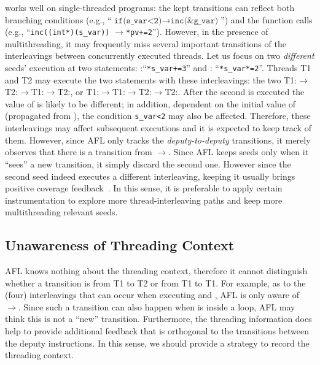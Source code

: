 \AFLIns works well on single-threaded programs: the kept transitions can reflect both branching conditions (e.g., ``$\texttt{{if}(s\_var<2)}\rightarrow\texttt{inc(\&g\_var)}$'') and the function calls (e.g., ``\texttt{inc((int*)(s\_var))} $\rightarrow $\texttt{*pv+=2}'').
However, in the presence of multithreading, 
it may frequently miss several important transitions of the interleavings between concurrently executed threads. Let us focus on two \emph{different} seeds' execution at two statements: :``\texttt{*s\_var+=3}'' and : ``\texttt{*s\_var*=2}''.  Threads T1 and T2 may execute the two statements with these interleavings: the two T1:$\rightarrow$T2:$\rightarrow$T1:$\rightarrow$T2:, or T1:$\rightarrow$T1:$\rightarrow$T2:$\rightarrow$T2:. After the second  is executed the value of  is likely to be different; in addition, dependent on the initial value of  (propagated from ), the condition \texttt{s\_var<2} may also be affected. Therefore, these interleavings may affect subsequent executions and it is expected to keep track of them. However, since AFL only tracks the \emph{deputy-to-deputy} transitions, 
it merely observes that there is a transition from $\rightarrow$.
Since AFL keeps seeds only when it ``sees'' a new transition, it simply discard the second one.
However since the second seed indeed executes a different interleaving, keeping it usually brings positive coverage feedback~\cite{fuzz_survey,ccs18_eval_fuzzing}.
In this sense, it is preferable to apply certain instrumentation to explore more thread-interleaving paths and keep more multithreading relevant seeds.

\subsection{Unawareness of Threading Context}
AFL knows nothing about the threading context, therefore it cannot distinguish whether a transition is from T1 to T2 or from T1 to T1. For example, as to the (four) interleavings that can occur when executing  and , AFL is only aware of $\rightarrow$. Since such a transition can also happen when  is inside a loop, AFL may think this is not a ``new'' transition. Furthermore, the threading information does help to provide additional feedback that is orthogonal to the transitions between the deputy instructions. In this sense, we should provide a strategy to record the threading context.



